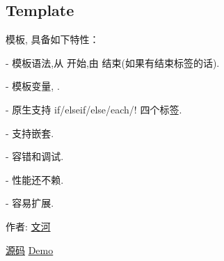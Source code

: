\documentclass[letterpaper,10pt,english]{sphinxmanual}
\begin{document}
\subsection{Template}
\label{api/component/template/index::doc}\label{api/component/template/index:template}
\begin{DUlineblock}{0em}
\item[] 模板, 具备如下特性：
\item[]
\begin{DUlineblock}{\DUlineblockindent}
\item[] - 模板语法,从  开始,由  结束(如果有结束标签的话).
\item[] - 模板变量,  .
\item[] - 原生支持 if/elseif/else/each/! 四个标签.
\item[] - 支持嵌套.
\item[] - 容错和调试.
\item[] - 性能还不赖.
\item[] - 容易扩展.
\end{DUlineblock}
\item[] 作者: \href{mailto:wenhe@taobao.com.com}{文河}
\item[] \href{https://github.com/kissyteam/kissy/tree/master/src/template/}{源码} \textbar{} \href{http://docs.kissyui.com/docs/html/api/component/template/index.html}{Demo}
\end{DUlineblock}
\end{document}
